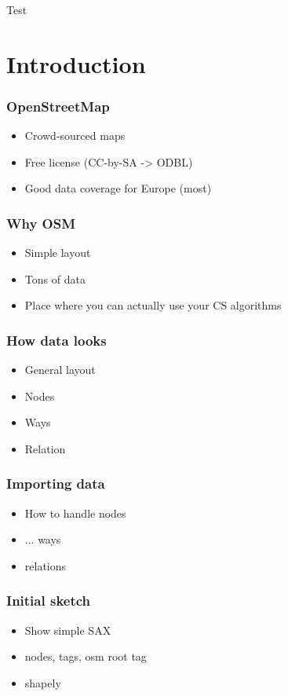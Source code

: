 \documentclass{beamer}
\begin{document}
\begin{frame}{Test}
  \begin{center}
    
  \end{center}
\end{frame}

\section{Introduction}

\begin{frame}
  \frametitle{OpenStreetMap}
  \begin{itemize}
  \item Crowd-sourced maps
  \item Free license (CC-by-SA -> ODBL)
  \item Good data coverage for Europe (most)
  \end{itemize}
\end{frame}

\begin{frame}
  \frametitle{Why OSM}
  \begin{itemize}
  \item Simple layout
  \item Tons of data
  \item Place where you can actually use your CS algorithms
  \end{itemize}
\end{frame}


\begin{frame}
  \frametitle{How data looks}
  \begin{itemize}
  \item General layout
  \item Nodes
  \item Ways
  \item Relation
  \end{itemize}
\end{frame}

\begin{frame}
  \frametitle{Importing data}
  \begin{itemize}
  \item How to handle nodes
  \item ... ways
  \item relations
  \end{itemize}
\end{frame}

\begin{frame}
  \frametitle{Initial sketch}
  \begin{itemize}
  \item Show simple SAX
  \item nodes, tags, osm root tag
  \item shapely
  \end{itemize}
\end{frame}
\end{document}
